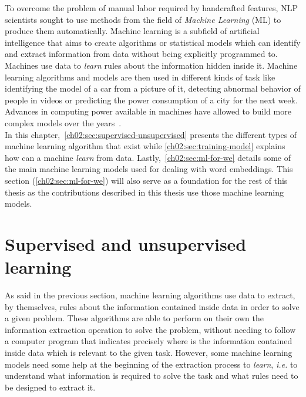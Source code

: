   To overcome the problem of manual labor required by handcrafted features, NLP
  scientists sought to use methods from the field of \textit{Machine Learning}
  (ML) to produce them automatically. Machine learning is a subfield of
  artificial intelligence that aims to create algorithms or statistical models
  which can identify and extract information from data without being explicitly
  programmed to. Machines use data to \textit{learn} rules about the
  information hidden inside it. Machine learning algorithms and models are then
  used in different kinds of task like identifying the model of a car from a
  picture of it, detecting abnormal behavior of people in videos or predicting
  the power consumption of a city for the next week. Advances in computing power
  available in machines have allowed to build more complex models over the
  years~\citep{taigman2014deepface, silver2016mastering, devlin2019bert}.\\

  In this chapter,~\autoref{ch02:sec:supervised-unsupervised} presents the
  different types of machine learning algorithm that exist while
  \autoref{ch02:sec:training-model} explains how can a machine \textit{learn}
  from data. Lastly,~\autoref{ch02:sec:ml-for-we} details some of the main
  machine learning models used for dealing with word embeddings. This section
  (\autoref{ch02:sec:ml-for-we}) will also serve as a foundation for the rest of
  this thesis as the contributions described in this thesis use those machine
  learning models.

\section{Supervised and unsupervised learning}
  \label{ch02:sec:supervised-unsupervised}
  As said in the previous section, machine learning algorithms use data to
  extract, by themselves, rules about the information contained inside data in
  order to solve a given problem. These algorithms are able to perform on their
  own the information extraction operation to solve the problem, without needing
  to follow a computer program that indicates precisely where is the information
  contained inside data which is relevant to the given task. However, some
  machine learning models need some help at the beginning of the extraction
  process to \textit{learn}, \textit{i.e.} to understand what information is
  required to solve the task and what rules need to be designed to extract
  it. \medskip

